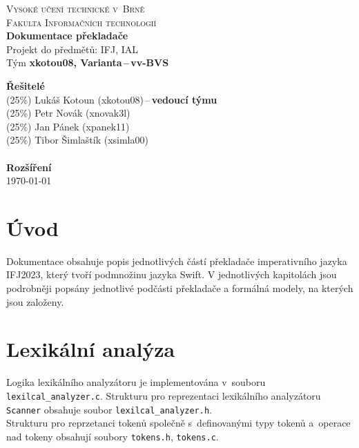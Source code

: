 \documentclass[11spt]{article}
\begin{document}
\begin{titlepage}
    \begin{center}
        \textsc{
        {\Huge Vysoké učení technické v~Brně}\\[0.5em]
        {\huge Fakulta Informačních technologií}} \\
        {\Huge \textbf{Dokumentace překladače}} \\[0.4em]
        {\Large Projekt do předmětů: IFJ, IAL} \\[2em]
        {\Large Tým \textbf{xkotou08, Varianta\,--\,vv-BVS}}
    \end{center}
    {\Large \textbf{Řešitelé}} \\[0.4em]
        {\Large
        \hspace*{0.5cm} (25\%) Lukáš Kotoun (xkotou08)\,--\,\textbf{vedoucí týmu}\\
        \hspace*{0.5cm} (25\%) Petr Novák (xnovak3l) \\
        \hspace*{0.5cm} (25\%) Jan Pánek (xpanek11) \\
        \hspace*{0.5cm} (25\%) Tibor Šimlaštík (xsimla00) \\
        }
     \\
    {\Large \textbf{Rozšíření}} \\[0.4em]


    {\Large \today}
\end{titlepage}


\tableofcontents
\newpage


\section{Úvod}
Dokumentace obsahuje popis jednotlivých částí překladače imperativního jazyka IFJ2023, který tvoří
podmnožinu jazyka Swift. V jednotlivých kapitolách jsou podrobněji popsány jednotlivé podčásti
překladače a formálná modely, na kterých jsou založeny.



\section{Lexikální analýza}
Logika lexikálního analyzátoru je implementována v~souboru \texttt{lexilcal\_analyzer.c}. 
Strukturu pro reprezentaci lexikálního analyzátoru \texttt{Scanner} obsahuje soubor \texttt{lexilcal\_analyzer.h}. \\
Strukturu pro reprzetanci tokenů společně s~definovanými typy tokenů a~operace nad tokeny obsahují soubory \texttt{tokens.h}, \texttt{tokens.c}.
\end{document}
